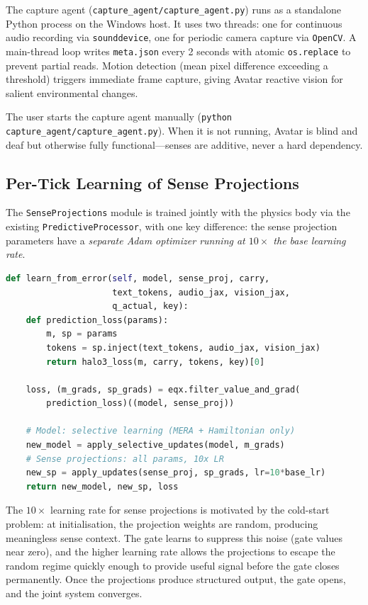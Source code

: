 The capture agent (\texttt{capture\_agent/capture\_agent.py}) runs as a standalone Python process on the Windows host.
It uses two threads: one for continuous audio recording via \texttt{sounddevice}, one for periodic camera capture via \texttt{OpenCV}.
A main-thread loop writes \texttt{meta.json} every 2 seconds with atomic \texttt{os.replace} to prevent partial reads.
Motion detection (mean pixel difference exceeding a threshold) triggers immediate frame capture, giving Avatar reactive vision for salient environmental changes.

The user starts the capture agent manually (\texttt{python capture\_agent/capture\_agent.py}).
When it is not running, Avatar is blind and deaf but otherwise fully functional---senses are additive, never a hard dependency.

\subsection{Per-Tick Learning of Sense Projections}
\label{sec:sense_learning}

The \texttt{SenseProjections} module is trained jointly with the physics body via the existing \texttt{PredictiveProcessor}, with one key difference: the sense projection parameters have a \emph{separate Adam optimizer running at $10\times$ the base learning rate}.

\begin{lstlisting}[language=python,caption={Joint backward pass through model and sense projections.},label=lst:joint_backward]
def learn_from_error(self, model, sense_proj, carry,
                     text_tokens, audio_jax, vision_jax,
                     q_actual, key):
    def prediction_loss(params):
        m, sp = params
        tokens = sp.inject(text_tokens, audio_jax, vision_jax)
        return halo3_loss(m, carry, tokens, key)[0]

    loss, (m_grads, sp_grads) = eqx.filter_value_and_grad(
        prediction_loss)((model, sense_proj))

    # Model: selective learning (MERA + Hamiltonian only)
    new_model = apply_selective_updates(model, m_grads)
    # Sense projections: all params, 10x LR
    new_sp = apply_updates(sense_proj, sp_grads, lr=10*base_lr)
    return new_model, new_sp, loss
\end{lstlisting}

The $10\times$ learning rate for sense projections is motivated by the cold-start problem: at initialisation, the projection weights are random, producing meaningless sense context.
The gate learns to suppress this noise (gate values near zero), and the higher learning rate allows the projections to escape the random regime quickly enough to provide useful signal before the gate closes permanently.
Once the projections produce structured output, the gate opens, and the joint system converges.

